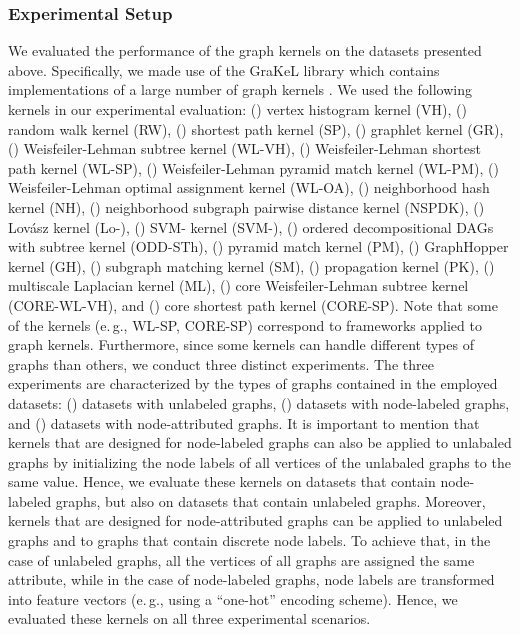 \documentclass[twoside,11pt]{article}
\newcommand{\eg}{e.\,g., }
\begin{document}
\subsubsection{Experimental Setup}
We evaluated the performance of the graph kernels on the datasets presented above. 
Specifically, we made use of the GraKeL library which contains implementations of a large number of graph kernels .
We used the following  kernels in our experimental evaluation: () vertex histogram kernel (VH), () random walk kernel (RW), () shortest path kernel (SP), () graphlet kernel (GR), () Weisfeiler-Lehman subtree kernel (WL-VH), () Weisfeiler-Lehman shortest path kernel (WL-SP), () Weisfeiler-Lehman pyramid match kernel (WL-PM), () Weisfeiler-Lehman optimal assignment kernel (WL-OA), () neighborhood hash kernel (NH), () neighborhood subgraph pairwise distance kernel (NSPDK), () Lov\'asz  kernel (Lo-), () SVM- kernel (SVM-), () ordered decompositional DAGs with subtree kernel (ODD-STh), () pyramid match kernel (PM), () GraphHopper kernel (GH), () subgraph matching kernel (SM), () propagation kernel (PK), () multiscale Laplacian kernel (ML), () core Weisfeiler-Lehman subtree kernel (CORE-WL-VH), and () core shortest path kernel (CORE-SP).
Note that some of the kernels (\eg WL-SP, CORE-SP) correspond to frameworks applied to graph kernels.
Furthermore, since some kernels can handle different types of graphs than others, we conduct three distinct experiments.
The three experiments are characterized by the types of graphs contained in the employed datasets: () datasets with unlabeled graphs, () datasets with node-labeled graphs, and () datasets with node-attributed graphs.
It is important to mention that kernels that are designed for node-labeled graphs can also be applied to unlabaled graphs by initializing the node labels of all vertices of the unlabaled graphs to the same value.
Hence, we evaluate these kernels on datasets that contain node-labeled graphs, but also on datasets that contain unlabeled graphs.
Moreover, kernels that are designed for node-attributed graphs can be applied to unlabeled graphs and to graphs that contain discrete node labels.
To achieve that, in the case of unlabeled graphs, all the vertices of all graphs are assigned the same attribute, while in the case of node-labeled graphs, node labels are transformed into feature vectors (\eg using a ``one-hot'' encoding scheme).
Hence, we evaluated these kernels on all three experimental scenarios.
\end{document}
